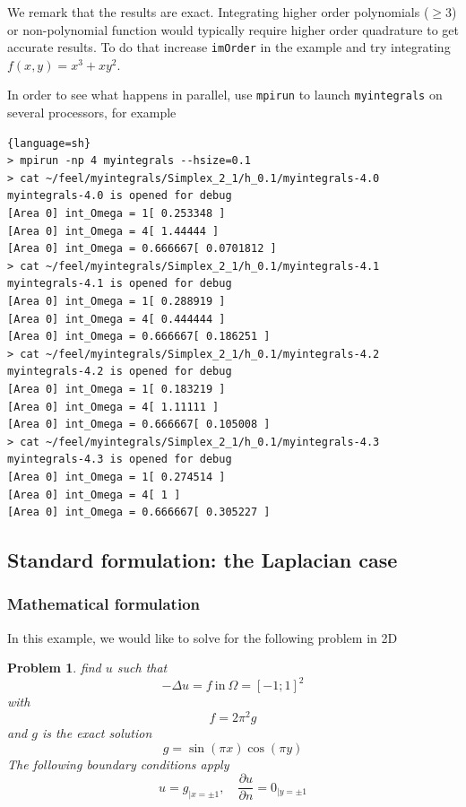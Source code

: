 \documentclass[a4paper]{book}
\newtheorem{problem}{Problem}
\begin{document}
We remark that the results are exact. Integrating higher order
polynomials ($\geq 3$) or non-polynomial function would typically
require higher order quadrature to get accurate results. To do that
increase \lstinline!imOrder! in the example and try integrating
$f(x,y)=x^3 + x y^2$.


In order to see what happens in parallel, use \lstinline!mpirun! to
launch \lstinline!myintegrals! on several processors, for example

\begin{lstlisting}{language=sh}
> mpirun -np 4 myintegrals --hsize=0.1
> cat ~/feel/myintegrals/Simplex_2_1/h_0.1/myintegrals-4.0
myintegrals-4.0 is opened for debug
[Area 0] int_Omega = 1[ 0.253348 ]
[Area 0] int_Omega = 4[ 1.44444 ]
[Area 0] int_Omega = 0.666667[ 0.0701812 ]
> cat ~/feel/myintegrals/Simplex_2_1/h_0.1/myintegrals-4.1
myintegrals-4.1 is opened for debug
[Area 0] int_Omega = 1[ 0.288919 ]
[Area 0] int_Omega = 4[ 0.444444 ]
[Area 0] int_Omega = 0.666667[ 0.186251 ]
> cat ~/feel/myintegrals/Simplex_2_1/h_0.1/myintegrals-4.2
myintegrals-4.2 is opened for debug
[Area 0] int_Omega = 1[ 0.183219 ]
[Area 0] int_Omega = 4[ 1.11111 ]
[Area 0] int_Omega = 0.666667[ 0.105008 ]
> cat ~/feel/myintegrals/Simplex_2_1/h_0.1/myintegrals-4.3
myintegrals-4.3 is opened for debug
[Area 0] int_Omega = 1[ 0.274514 ]
[Area 0] int_Omega = 4[ 1 ]
[Area 0] int_Omega = 0.666667[ 0.305227 ]
\end{lstlisting}

\subsection{Standard formulation: the Laplacian case}
\label{sec:defin-bilin-forms}
\subsubsection{Mathematical formulation}
\label{sec:math-form-3}
In this example, we would like to solve for the following problem in 2D
\begin{problem}
\label{prob:1}
 find $u$ such that
\begin{equation}
  \label{eq:1}
  -\Delta u = f\ \text{in}\ \Omega = [-1;1]^2
\end{equation}
with
\begin{equation}
  \label{eq:2}
  f= 2 \pi^2  g
\end{equation}
and $g$ is the exact solution
\begin{equation}
  \label{eq:3}
  g=\sin(\pi x) \cos(\pi y)
\end{equation}
The following boundary conditions apply
\begin{equation}
  \label{eq:4}
  u=g_{|x=\pm 1}, \quad \frac{\partial u}{\partial n} = 0_{|y=\pm 1}
\end{equation}
\end{problem}
\end{document}
